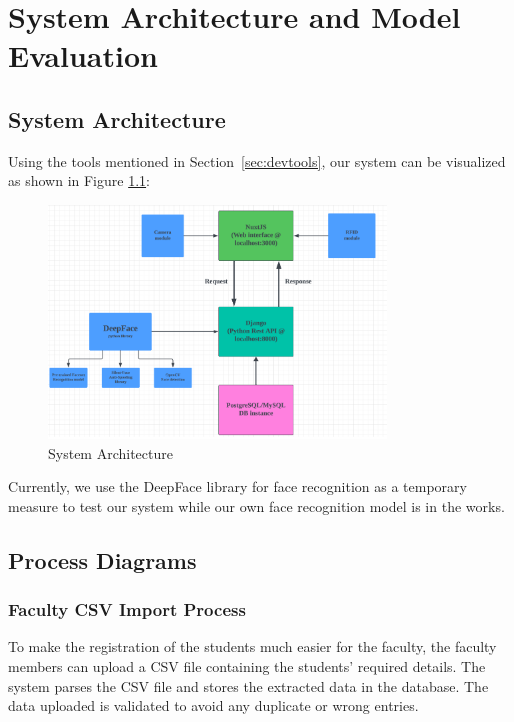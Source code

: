 \chapter{System Architecture and Model Evaluation}

\section{System Architecture}
Using the tools mentioned in Section~\ref{sec:devtools}, our system can be visualized as shown in Figure \ref{fig:architecture}: 
\begin{figure}[h] %
	\centering
	\includegraphics[width=0.8\textwidth]{figures/chapter4/architecture.png} %
	\caption{System Architecture}
	\label{fig:architecture}
\end{figure}

Currently, we use the DeepFace library for face recognition as a temporary measure to test our system while our own face recognition model is in the works.
\section{Process Diagrams}

\subsection{Faculty CSV Import Process}
	To make the registration of the students much easier for the faculty, the faculty members can upload a CSV file containing the students' required details. The system parses the CSV file and stores the extracted data in the database. The data uploaded is validated to avoid any duplicate or wrong entries.

